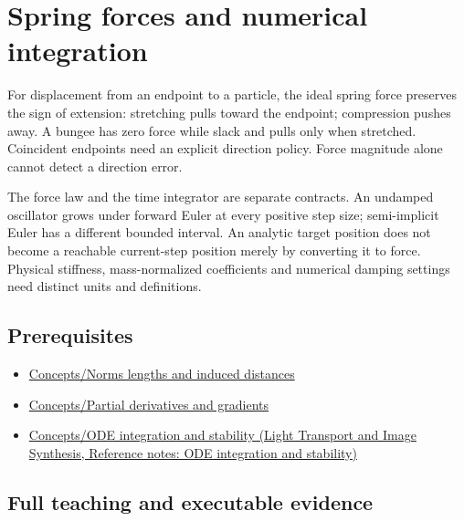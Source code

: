 \hypertarget{appendix-e040e2108923}{}\label{referencestart:appendix-e040e2108923}
\section{Spring forces and numerical integration}\label{appendix-e040e2108923-spring-forces-and-numerical-integration}

\hypertarget{appendix-e040e2108923-spring-forces-and-numerical-integration}{}

For displacement from an endpoint to a particle, the ideal spring force preserves the sign of extension: stretching pulls toward the endpoint; compression pushes away. A bungee has zero force while slack and pulls only when stretched. Coincident endpoints need an explicit direction policy. Force magnitude alone cannot detect a direction error.

The force law and the time integrator are separate contracts. An undamped oscillator grows under forward Euler at every positive step size; semi-implicit Euler has a different bounded interval. An analytic target position does not become a reachable current-step position merely by converting it to force. Physical stiffness, mass-normalized coefficients and numerical damping settings need distinct units and definitions.

\subsection{Prerequisites}\label{appendix-e040e2108923-prerequisites}

\hypertarget{appendix-e040e2108923-prerequisites}{}

\begin{itemize}
\tightlist
\item
  \hyperref[appendix-49933872bb51]{Concepts/Norms lengths and induced distances}
\item
  \hyperref[appendix-677b59746ae0]{Concepts/Partial derivatives and gradients}
\item
  \href{../04-Light-Transport-and-Image-Synthesis/main.pdf\#nameddest=appendix-18eacf61a04b}{Concepts/ODE integration and stability (Light Transport and Image Synthesis, Reference notes: ODE integration and stability)}
\end{itemize}

\subsection{Full teaching and executable evidence}\label{appendix-e040e2108923-full-teaching-and-executable-evidence}

